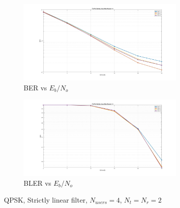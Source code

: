\documentclass[12pt,a4paper,notitlepage,twoside,headsepline]{scrartcl}
\begin{document}
\begin{figure}
\centering
\begin{subfigure}{.5\textwidth}
  \centering
  \includegraphics[width=0.9\textwidth]{figures/sl_nu4_ber}
  \caption{BER vs $E_b/N_o$} 
  \label{fig:example}
\end{subfigure}%
\begin{subfigure}{.5\textwidth}
  \centering
  \includegraphics[width=0.9\textwidth]{figures/sl_nu4_bler}
  \caption{BLER vs $E_b/N_o$}
  \label{fig:example}
\end{subfigure}
\caption{QPSK, Strictly linear filter, $N_{users} = 4$, $N_t = N_r = 2$}
\label{fig:test}
\end{figure}
\end{document}
